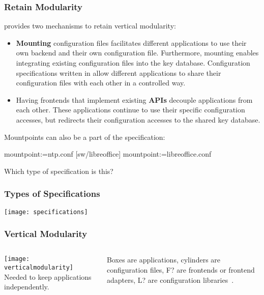 \begin{frame}
	\frametitle{Retain Modularity \cite{raab2016improving}}

	\elektra{} provides two mechanisms to retain vertical modularity:

	\begin{itemize}
	\item \textbf{Mounting} configuration files facilitates different applications to use their own backend and their own configuration file.
	Furthermore, mounting enables integrating existing configuration files into the key database.
	Configuration specifications written in  allow different applications to share their configuration files with each other in a controlled way.

	\item Having frontends that implement existing \textbf{APIs} decouple applications from each other.
	These applications continue to use their specific configuration accesses, but \elektra{} redirects their configuration accesses to the shared key database.
	\end{itemize}
\end{frame}

\begin{frame}[fragile]
	Mountpoints can also be a part of the specification:

	\begin{code}[language=Cpp,gobble=4,showspaces=no]
	[ntp]
	  mountpoint:=ntp.conf
	[sw/libreoffice]
	  mountpoint:=libreoffice.conf
	\end{code}

	\begin{task}
	Which type of specification is this?
	\end{task}
\end{frame}

\begin{frame}
	\frametitle{Types of Specifications}
	\texttt{[image: specifications]}
\end{frame}

\begin{frame}
	\frametitle{Vertical Modularity}
	\begin{columns}[c]
	\column{7cm}
	\texttt{[image: verticalmodularity]}
	\column{4cm}
	Needed to keep applications independently.

	Boxes are applications, cylinders are configuration files, F? are frontends or frontend adapters, L? are configuration libraries~\cite{raab2016improving}.
	\end{columns}
\end{frame}



